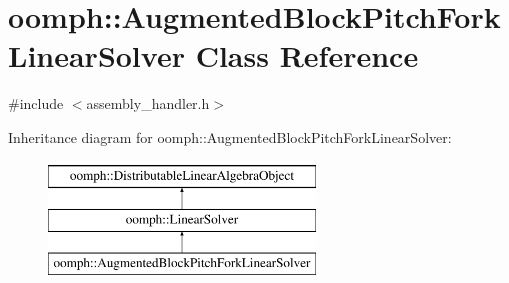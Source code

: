 \hypertarget{classoomph_1_1AugmentedBlockPitchForkLinearSolver}{}\section{oomph\+:\+:Augmented\+Block\+Pitch\+Fork\+Linear\+Solver Class Reference}
\label{classoomph_1_1AugmentedBlockPitchForkLinearSolver}


{\ttfamily \#include $<$assembly\+\_\+handler.\+h$>$}

Inheritance diagram for oomph\+:\+:Augmented\+Block\+Pitch\+Fork\+Linear\+Solver\+:\begin{figure}[H]
\begin{center}
\leavevmode
\includegraphics[height=3.000000cm]{classoomph_1_1AugmentedBlockPitchForkLinearSolver}
\end{center}
\end{figure}
